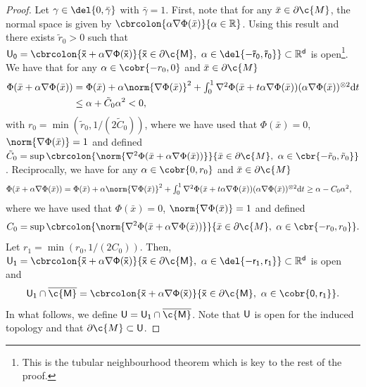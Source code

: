 \begin{proof}
	Let $\gamma \in \del{0, \bar{\gamma}}$ with $\bar{\gamma} = 1$.
	First, note that for any $\bar{x} \in \partial \c{M}$, the normal space is given by $\cbrcolon{\alpha \nabla \Phi(\bar{x})}{\alpha \in \R}$.
	Using this result and \cite[Theorem 6.24]{lee2013smooth} there exists $\tilde{r}_0 > 0$ such that $\sf{U}_0 = \cbrcolon{\bar{x} + \alpha \nabla \Phi(\bar{x})}{\bar{x} \in \partial \c{M}, \ \alpha \in \del{-\tilde{r}_0, \tilde{r}_0}} \subset \R^d$ is open\footnote{This is the tubular neighbourhood theorem which is key to the rest of the proof.
	}.
	We have that for any $\alpha \in \cobr{-r_0, 0}$ and $\bar{x} \in \partial \c{M}$ \begin{align} \Phi(\bar{x}+\alpha \nabla \Phi(\bar{x})) &= \textstyle{\Phi(\bar{x}) + \alpha \norm{\nabla \Phi(\bar{x})}^2 + \int_0^1 \nabla^2 \Phi(\bar{x}+t\alpha \nabla \Phi(\bar{x}))(\alpha \nabla \Phi(\bar{x}))^{\otimes 2} \mathrm{d} t } \\ &\leq \alpha + \tilde{C}_0 \alpha^2 < 0, \end{align} with $r_0 = \min(\tilde{r}_0, 1/(2\tilde{C}_0 ))$, where we have used that $\Phi(\bar{x}) = 0$, $\norm{\nabla \Phi(\bar{x})}=1$ and defined $\tilde{C}_0 = \sup \cbrcolon{\norm{\nabla^2 \Phi(\bar{x}+\alpha \nabla \Phi(\bar{x}))}}{\bar{x} \in \partial \c{M}, \ \alpha \in \cbr{-\tilde{r}_0,\tilde{r}_0}}$.
	Reciprocally, we have for any $\alpha \in \cobr{0,r_0}$ and $\bar{x} \in \partial \c{M}$ \begin{align} \Phi(\bar{x}+\alpha \nabla \Phi(\bar{x})) &= \textstyle{\Phi(\bar{x}) + \alpha \norm{\nabla \Phi(\bar{x})}^2 + \int_0^1 \nabla^2 \Phi(\bar{x}+t\alpha \nabla \Phi(\bar{x}))(\alpha \nabla \Phi(\bar{x}))^{\otimes 2} \mathrm{d} t } \geq \alpha - C_0 \alpha^2, \end{align} where we have used that $\Phi(\bar{x}) =0$, $\norm{\nabla \Phi(\bar{x})}=1$ and defined \[C_0 = \sup \cbrcolon{\norm{\nabla^2 \Phi(\bar{x}+\alpha \nabla \Phi(\bar{x}))}}{\bar{x} \in \partial \c{M}, \ \alpha \in \cbr{-r_0,r_0}}.\]
	Let $r_1 = \min(r_0, 1/(2C_0))$.
	Then, $\sf{U}_1 = \cbrcolon{\bar{x} + \alpha \nabla \Phi(\bar{x})}{\bar{x} \in \partial \c{M}, \ \alpha \in \del{-r_1, r_1}} \subset \R^d$ is open and \begin{equation} \sf{U}_1 \cap \cl{\c{M}} = \cbrcolon{\bar{x} + \alpha \nabla \Phi(\bar{x})}{\bar{x} \in \partial \c{M}, \ \alpha \in \cobr{0, r_1}} .
	\end{equation}
	In what follows, we define $\sf{U} = \sf{U}_1 \cap \cl{\c{M}}$.
	Note that $\sf{U}$ is open for the induced topology and that $\partial \c{M} \subset \sf{U}$.

\end{proof}
